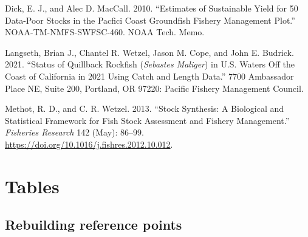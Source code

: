 \documentclass[11pt,
  english,
  a4paper,
]{article}
\begin{document}

\hypertarget{refs}{}
\leavevmode\hypertarget{ref-DickandMacCall_dbsra_2010}{}%
Dick, E. J., and Alec D. MacCall. 2010. ``Estimates of Sustainable Yield for 50 Data-Poor Stocks in the Pacfici Coast Groundfish Fishery Management Plot.'' NOAA-TM-NMFS-SWFSC-460. NOAA Tech. Memo.

\leavevmode\hypertarget{ref-Langseth_status_2021}{}%
Langseth, Brian J., Chantel R. Wetzel, Jason M. Cope, and John E. Budrick. 2021. ``Status of Quillback Rockfish (\emph{Sebastes Maliger}) in U.S. Waters Off the Coast of California in 2021 Using Catch and Length Data.'' 7700 Ambassador Place NE, Suite 200, Portland, OR 97220: Pacific Fishery Management Council.

\leavevmode\hypertarget{ref-methot_stock_2013}{}%
Methot, R. D., and C. R. Wetzel. 2013. ``Stock Synthesis: A Biological and Statistical Framework for Fish Stock Assessment and Fishery Management.'' \emph{Fisheries Research} 142 (May): 86--99. \url{https://doi.org/10.1016/j.fishres.2012.10.012}.

\leavevmode\tagmcend\tagstructend

\clearpage


\hypertarget{tables}{%
\section{Tables}\label{tables}}

\leavevmode\tagmcend\tagstructend


\hypertarget{rebuilding-reference-points-1}{%
\subsection{Rebuilding reference points}\label{rebuilding-reference-points-1}}

\leavevmode\tagmcend\tagstructend

\begingroup\fontsize{10}{12}\selectfont
\begingroup\fontsize{10}{12}\selectfont
\end{document}
